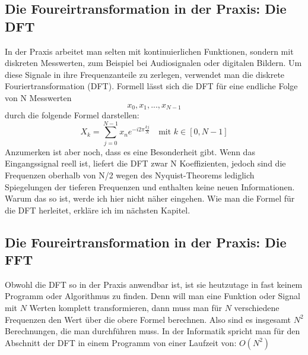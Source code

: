 \documentclass[a4paper,12pt]{article}
\theoremstyle{definition}
\theoremstyle{remark}
\begin{document}
\subsection{Die Foureirtransformation in der Praxis: Die DFT}
In der Praxis arbeitet man selten mit kontinuierlichen Funktionen, sondern mit diskreten Messwerten, zum Beispiel bei Audiosignalen oder digitalen Bildern. Um diese Signale in ihre Frequenzanteile zu zerlegen, verwendet man die diskrete Fouriertransformation (DFT).
Formell lässt sich die DFT für eine endliche Folge von N Messwerten
$$x_0, x_1,..., x_{N-1}$$
durch die folgende Formel darstellen:
$$X_k = \sum_{j = 0}^{N-1}{x_n e^{-i2\pi \frac{kj}{N}}} \quad \text{mit } k\in[0, N-1]$$
Anzumerken ist aber noch, dass es eine Besonderheit gibt. Wenn das Eingangssignal reell ist, 
liefert die DFT zwar N Koeffizienten, jedoch sind die Frequenzen oberhalb von N/2 wegen des 
Nyquist-Theorems lediglich Spiegelungen der tieferen Frequenzen und enthalten keine neuen 
Informationen. Warum das so ist, werde ich hier nicht näher eingehen. Wie man die Formel für 
die DFT herleitet, erkläre ich im nächsten Kapitel.

\subsection{Die Foureirtransformation in der Praxis: Die FFT}
Obwohl die DFT so in der Praxis anwendbar ist, ist sie heutzutage in fast keinem Programm oder 
Algorithmus zu finden. Denn will man eine Funktion oder Signal mit $N$ Werten komplett 
transformieren, dann muss man für $N$ verschiedene Frequenzen den Wert über die obere Formel 
berechnen. Also sind es insgesamt $N^2$ Berechnungen, die man durchführen muss. In der Informatik 
spricht man für den Abschnitt der DFT in einem Programm von einer Laufzeit von:   $O(N^2)$
\end{document}
